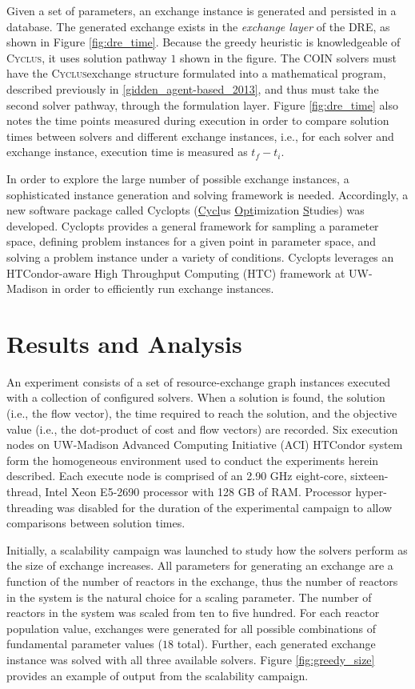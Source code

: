 \documentclass{anstrans}
\newcommand{\Cyclus}{\textsc{Cyclus}}
\begin{document}
Given a set of parameters, an exchange instance is generated and persisted in a
database. The generated exchange exists in the \textit{exchange layer} of the
DRE, as shown in Figure \ref{fig:dre_time}. Because the greedy heuristic is
knowledgeable of \Cyclus, it uses solution pathway $1$ shown in the figure. The
COIN solvers must have the \Cyclus exchange structure formulated into a
mathematical program, described previously in \ref{gidden_agent-based_2013}, and
thus must take the second solver pathway, through the formulation layer. Figure
\ref{fig:dre_time} also notes the time points measured during execution in order
to compare solution times between solvers and different exchange instances,
i.e., for each solver and exchange instance, execution time is measured as $t_f
- t_i$.

In order to explore the large number of possible exchange instances, a
sophisticated instance generation and solving framework is needed. Accordingly,
a new software package called Cyclopts (\underline{Cycl}us
\underline{Opt}imization \underline{S}tudies) was developed. Cyclopts provides a
general framework for sampling a parameter space, defining problem instances for
a given point in parameter space, and solving a problem instance under a variety
of conditions. Cyclopts leverages an HTCondor-aware High Throughput Computing
(HTC) framework at UW-Madison in order to efficiently run exchange instances. 


\section{Results and Analysis}

An experiment consists of a set of resource-exchange graph instances executed
with a collection of configured solvers. When a solution is found, the solution
(i.e., the flow vector), the time required to reach the solution, and the
objective value (i.e., the dot-product of cost and flow vectors) are
recorded. Six execution nodes on UW-Madison Advanced Computing Initiative (ACI)
HTCondor system form the homogeneous environment used to conduct the experiments
herein described. Each execute node is comprised of an 2.90 GHz eight-core,
sixteen-thread, Intel Xeon E5-2690 processor with 128 GB of RAM. Processor
hyper-threading was disabled for the duration of the experimental campaign to
allow comparisons between solution times.

Initially, a scalability campaign was launched to study how the solvers perform
as the size of exchange increases. All parameters for generating an exchange are
a function of the number of reactors in the exchange, thus the number of
reactors in the system is the natural choice for a scaling parameter. The number
of reactors in the system was scaled from ten to five hundred. For each reactor
population value, exchanges were generated for all possible combinations of
fundamental parameter values ($18$ total). Further, each generated exchange
instance was solved with all three available solvers. Figure
\ref{fig:greedy_size} provides an example of output from the scalability
campaign.
\end{document}
